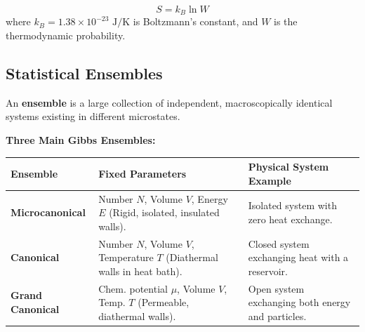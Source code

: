 \documentclass[12pt,a4paper]{article}
\begin{document}
\begin{tcolorbox}[formulabox, title={\textbf{Boltzmann Entropy Relation}}]
\begin{equation}
S = k_B \ln W
\end{equation}
where $k_B = 1.38 \times 10^{-23}\text{ J/K}$ is Boltzmann's constant, and $W$ is the thermodynamic probability.
\end{tcolorbox}

\subsection{Statistical Ensembles}

An \textbf{ensemble} is a large collection of independent, macroscopically identical systems existing in different microstates.

\textbf{Three Main Gibbs Ensembles:}\par\vspace{6pt}\noindent
\begin{tabularx}{\linewidth}{|B{3.2cm}|Y|Y|}
\hline
\textbf{Ensemble} & \textbf{Fixed Parameters} & \textbf{Physical System Example} \\
\hline
\textbf{Microcanonical} & Number $N$, Volume $V$, Energy $E$ (Rigid, isolated, insulated walls). & Isolated system with zero heat exchange. \\
\hline
\textbf{Canonical} & Number $N$, Volume $V$, Temperature $T$ (Diathermal walls in heat bath). & Closed system exchanging heat with a reservoir. \\
\hline
\textbf{Grand Canonical} & Chem. potential $\mu$, Volume $V$, Temp. $T$ (Permeable, diathermal walls). & Open system exchanging both energy and particles. \\
\hline
\end{tabularx}
\end{document}
